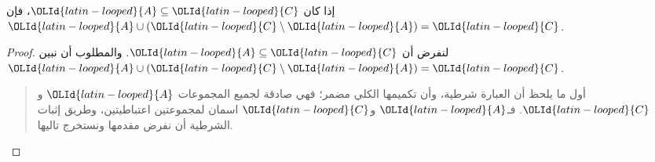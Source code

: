 \documentclass[../../../include/open-logic-section]{subfiles}
\begin{document}


\begin{prop}
إذا كان ${\OLId{latin-looped}{A}} \subseteq {\OLId{latin-looped}{C}}$، فإن ${\OLId{latin-looped}{A}} \cup ({\OLId{latin-looped}{C}} \setminus {\OLId{latin-looped}{A}}) = {\OLId{latin-looped}{C}}$.
\end{prop}

\begin{proof}
  لنفرض أن ${\OLId{latin-looped}{A}} \subseteq {\OLId{latin-looped}{C}}$. والمطلوب أن نبين
  ${\OLId{latin-looped}{A}} \cup ({\OLId{latin-looped}{C}} \setminus {\OLId{latin-looped}{A}}) = {\OLId{latin-looped}{C}}$.
  \begin{quote}
    أول ما يلحظ أن العبارة شرطية، وأن تكميمها الكلي مضمر؛ فهي صادقة
    لجميع المجموعات ${\OLId{latin-looped}{A}}$ و${\OLId{latin-looped}{C}}$. فـ${\OLId{latin-looped}{A}}$ و${\OLId{latin-looped}{C}}$ اسمان لمجموعتين اعتباطيتين،
    وطريق إثبات الشرطية أن نفرض مقدمها ونستخرج تاليها.


\end{quote}
\end{proof}
\end{document}
